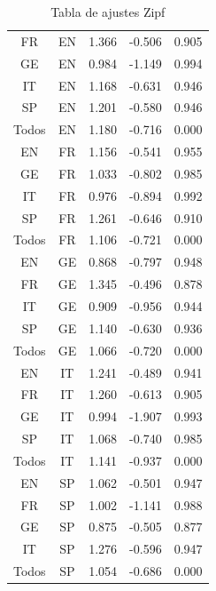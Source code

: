 \documentclass[10pt,letterpaper]{article} %
\begin{document}
\begin{table}
	\centering
	\begin{tabular}{ccccc}
		\toprule
		\thead{Idioma A} & \thead{Idioma B} & \thead{$\alpha$} & \thead{$\beta$} & \thead{ $R^{2}$ } \\
		\midrule
		FR & EN & 1.366 & -0.506 & 0.905 \\
		GE & EN & 0.984 & -1.149 & 0.994 \\
		IT & EN & 1.168 & -0.631 & 0.946 \\
		SP & EN & 1.201 & -0.580 & 0.946 \\
		Todos & EN & 1.180 & -0.716 & 0.000 \\
		EN & FR & 1.156 & -0.541 & 0.955 \\
		GE & FR & 1.033 & -0.802 & 0.985 \\
		IT & FR & 0.976 & -0.894 & 0.992 \\
		SP & FR & 1.261 & -0.646 & 0.910 \\
		Todos & FR & 1.106 & -0.721 & 0.000 \\
		EN & GE & 0.868 & -0.797 & 0.948 \\
		FR & GE & 1.345 & -0.496 & 0.878 \\
		IT & GE & 0.909 & -0.956 & 0.944 \\
		SP & GE & 1.140 & -0.630 & 0.936 \\
		Todos & GE & 1.066 & -0.720 & 0.000 \\
		EN & IT & 1.241 & -0.489 & 0.941 \\
		FR & IT & 1.260 & -0.613 & 0.905 \\
		GE & IT & 0.994 & -1.907 & 0.993 \\
		SP & IT & 1.068 & -0.740 & 0.985 \\
		Todos & IT & 1.141 & -0.937 & 0.000 \\
		EN & SP & 1.062 & -0.501 & 0.947 \\
		FR & SP & 1.002 & -1.141 & 0.988 \\
		GE & SP & 0.875 & -0.505 & 0.877 \\
		IT & SP & 1.276 & -0.596 & 0.947 \\
		Todos & SP & 1.054 & -0.686 & 0.000 \\
		\bottomrule
	\end{tabular}
	\caption{Tabla de ajustes Zipf}
	\label{tab.Ajustes Zipf}
\end{table}

\end{document}
